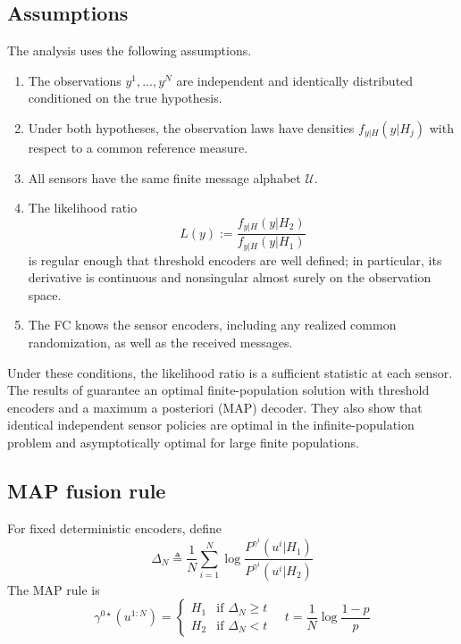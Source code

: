 \documentclass[conference]{IEEEtran}
\begin{document}
\subsection{Assumptions}
The analysis uses the following assumptions.
\begin{enumerate}
 \item The observations $y^1,\ldots,y^N$ are independent and
 identically distributed conditioned on the true hypothesis.
 \item Under both hypotheses, the observation laws have densities
 $f_{y|H}(y|H_j)$ with respect to a common reference
 measure.
 \item All sensors have the same finite message alphabet $\mathcal{U}$.
 \item The likelihood ratio
 \begin{equation*}
  L(y):=\frac{f_{y|H}(y|H_2)}
  {f_{y|H}(y|H_1)}
 \end{equation*}
 is regular enough that threshold encoders are well defined; in
 particular, its derivative is continuous and nonsingular almost
 surely on the observation space.
 \item The FC knows the sensor encoders, including any realized common
 randomization, as well as the received messages.
\end{enumerate}

Under these conditions, the likelihood ratio is a sufficient statistic
at each sensor.  The results of \cite{Sanjari2025} guarantee an optimal
finite-population solution with threshold encoders and a maximum a
posteriori (MAP) decoder.  They also show that identical independent
sensor policies are optimal in the infinite-population problem and
asymptotically optimal for large finite populations.

\subsection{MAP fusion rule}
For fixed deterministic encoders, define
\begin{equation}
 \Delta_N \triangleq \frac{1}{N}\sum_{i=1}^{N}
 \log\frac{P^{\gamma^i}(u^i|H_1)}
 {P^{\gamma^i}(u^i|H_2)}
 \label{eq:delta}
\end{equation}
The MAP rule is
\begin{equation}
 \gamma^{0\star}(u^{1:N})=
 \begin{cases}
  H_1 & \text{if } \Delta_N\ge t\\
  H_2 & \text{if } \Delta_N<t
 \end{cases}
 \quad
 t=\frac{1}{N}\log\frac{1-p}{p}
 \label{eq:map}
\end{equation}
\end{document}

